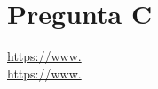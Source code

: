 \documentclass[10pt]{article}
\begin{document}
	
	
	\begin{itemize}
		\lipsum
		
	\end{itemize}
	
	
	\section{Pregunta C}
	\begin{itemize}
		\lipsum
		
	\end{itemize}
	
	
	
	\begin{thebibliography}{2}
		
		
		\url{https://www.}\\
		\url{https://www.}
	\end{thebibliography}
	
	
\end{document}

